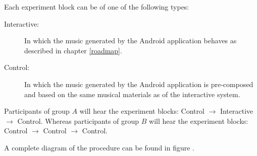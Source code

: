 Each experiment block can be of one of the following types:
\begin{description}
	\item[Interactive:] In which the music generated by the Android application behaves as described in chapter \ref{roadmap}.
	\item[Control:] In which the music generated by the Android application is pre-composed and based on the same musical materials as of the interactive system.
\end{description}

Participants of group $A$ will hear the experiment blocks: Control $\rightarrow$ Interactive $\rightarrow$ Control. Whereas participants of group $B$ will hear the experiment blocks: Control $\rightarrow$ Control $\rightarrow$ Control.

A complete diagram of the procedure can be found in figure .